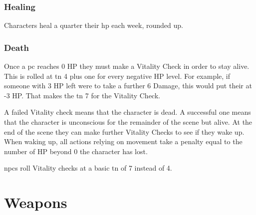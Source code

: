 \begin{multicols}{2}
\subsubsection{Healing}
Characters heal a quarter their \gls{hp} each week, rounded up.

\subsubsection{Death}
Once a \gls{pc} reaches 0 HP they must make a Vitality Check in order to stay alive.
This is rolled at \gls{tn} 4 plus one for every negative HP level.\iftoggle{verbose}{\footnote{Traits such as Strength do not affect the Vitality check because in a way, they already have.
Stronger characters already have more \gls{hp}, which has already kept them farther from death.}}{}
For example, if someone with 3 HP left were to take a further 6 Damage, this would put their at -3 HP.
That makes the \gls{tn} 7 for the Vitality Check.

A failed Vitality check means that the character is dead. A successful one means that the character is unconscious for the remainder of the scene but alive. At the end of the scene they can make further Vitality Checks to see if they wake up. When waking up, all actions relying on movement take a penalty equal to the number of HP beyond 0 the character has lost.

\glspl{npc} roll Vitality checks at a basic \gls{tn} of 7 instead of 4.


\end{multicols}

\section{Weapons}

